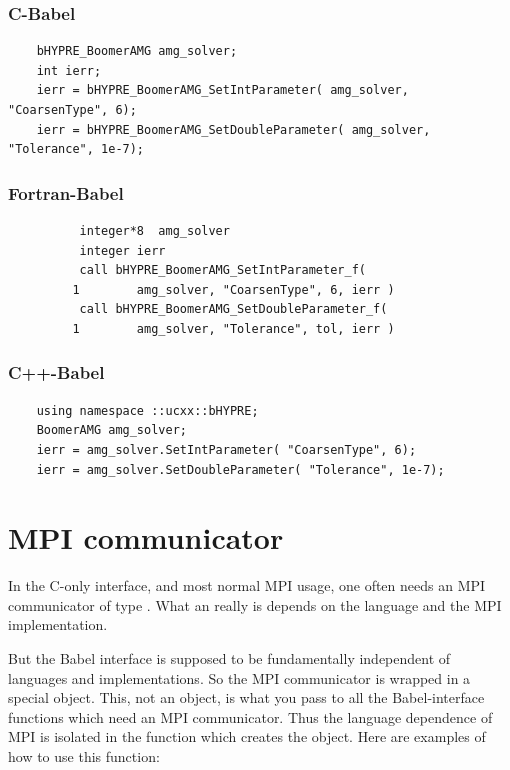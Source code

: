 \subsubsection{C-Babel}
\begin{verbatim}
    bHYPRE_BoomerAMG amg_solver;
    int ierr;
    ierr = bHYPRE_BoomerAMG_SetIntParameter( amg_solver, "CoarsenType", 6);
    ierr = bHYPRE_BoomerAMG_SetDoubleParameter( amg_solver, "Tolerance", 1e-7);
\end{verbatim}

\subsubsection{Fortran-Babel}
\begin{verbatim}
          integer*8  amg_solver
          integer ierr
          call bHYPRE_BoomerAMG_SetIntParameter_f(
         1        amg_solver, "CoarsenType", 6, ierr )
          call bHYPRE_BoomerAMG_SetDoubleParameter_f(
         1        amg_solver, "Tolerance", tol, ierr )
\end{verbatim}

\subsubsection{C++-Babel}
\begin{verbatim}
    using namespace ::ucxx::bHYPRE;
    BoomerAMG amg_solver;
    ierr = amg_solver.SetIntParameter( "CoarsenType", 6);
    ierr = amg_solver.SetDoubleParameter( "Tolerance", 1e-7);
\end{verbatim}



\section{MPI communicator}

In the C-only \hypre{} interface, and most normal MPI usage, one often
needs an MPI communicator of type .  What an
 really is depends on the language and the MPI
implementation.

But the Babel interface is supposed to be fundamentally independent of
languages and implementations.  So the MPI communicator is wrapped in
a special  object.  This, not an
 object, is what you pass to all the Babel-interface
functions which need an MPI communicator.  Thus the language
dependence of MPI is isolated in the function which creates the
 object.  Here are examples of how to use
this function:

